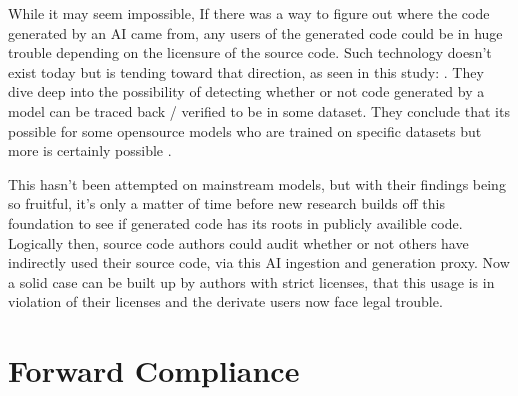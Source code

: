 \documentclass[journal]{IEEEtran}
\begin{document}

While it may seem impossible, If there was a way to figure out where
the code generated by an AI came from, any users of the generated code
could be in huge trouble depending on the licensure of the source code.
Such technology doesn't exist today but is tending toward that direction,
as seen in this study: \cite{ma2024}. They dive deep into the possibility
of detecting whether or not code generated by a model can be traced
back / verified to be in some dataset. They conclude that its
possible for some opensource models who are trained on specific datasets
but more is certainly possible \cite{ma2024}.

This hasn't been attempted on mainstream models, but
with their findings being so fruitful, it's only a matter of time
before new research builds off this foundation to see if
generated code has its roots in publicly availible code. Logically then,
source code authors could audit whether or not others have indirectly used their
source code, via this AI ingestion and generation proxy. Now a solid case
can be built up by authors with strict licenses, that this usage is
in violation of their licenses and the derivate users now face
legal trouble.

\section{Forward Compliance}


\end{document}
